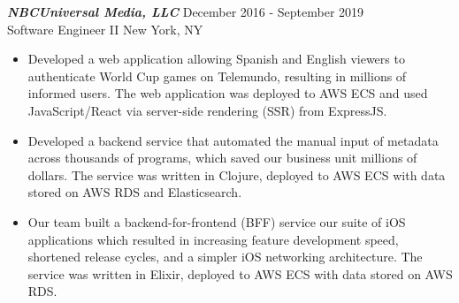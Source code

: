 {\sl \textbf{NBCUniversal Media, LLC}} \hfill December 2016 - September 2019 \\ Software Engineer II \hfill New York, NY
\begin{itemize}
    \item Developed a web application allowing Spanish and English viewers to authenticate World Cup games on Telemundo, resulting in millions of informed users. The web application was deployed to AWS ECS and used JavaScript/React via server-side rendering (SSR) from ExpressJS.
    \item Developed a backend service that automated the manual input of metadata across thousands of programs, which saved our business unit millions of dollars. The service was written in Clojure, deployed to AWS ECS with data stored on AWS RDS and Elasticsearch.
    \item Our team built a backend-for-frontend (BFF) service our suite of iOS applications which resulted in increasing feature development speed, shortened release cycles, and a simpler iOS networking architecture. The service was written in Elixir, deployed to AWS ECS with data stored on AWS RDS.
\end{itemize}
